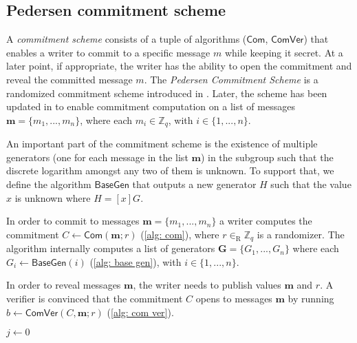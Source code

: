 \subsection{Pedersen commitment scheme}
A \textit{commitment scheme} consists of a tuple of algorithms ($\mathsf{Com}$, $\mathsf{ComVer}$) that enables a writer to commit to a specific message $m$ while keeping it secret. At a later point, if appropriate, the writer has the ability to open the commitment and reveal the committed message $m$. The \textit{Pedersen Commitment Scheme} is a randomized commitment scheme introduced in \cite{Pedersen91-commitment}. Later, the scheme has been updated in \cite{Bootle18} to enable commitment computation on a list of messages $\boldsymbol{m} = \{ m_1, ..., m_n \}$, where each $m_i \in \mathbb{Z}_q$, with $i \in \{ 1, ..., n \}$.

An important part of the commitment scheme is the existence of multiple generators (one for each message in the list  $\boldsymbol{m}$) in the subgroup such that the discrete logarithm amongst any two of them is unknown. To support that, we define the algorithm $\mathsf{BaseGen}$ that outputs a new generator $H$ such that the value $x$ is unknown where $H = [x]G$.

In order to commit to messages $\boldsymbol{m} = \{ m_1, ..., m_n \}$ a writer computes the commitment $C \gets \mathsf{Com}(\boldsymbol{m}; r)$ (\cref{alg: com}), where $r \in_\mathrm{R} \mathbb{Z}_q$ is a randomizer. The algorithm internally computes a list of generators $\boldsymbol{G} = \{ G_1, ..., G_n \}$ where each $G_i \gets \mathsf{BaseGen}(i)$ (\cref{alg: base gen}), with $i \in \{ 1, ..., n \}$.

In order to reveal messages $\boldsymbol{m}$, the writer needs to publish values $\boldsymbol{m}$ and $r$. A verifier is convinced that the commitment $C$ opens to messages $\boldsymbol{m}$ by running $b \gets \mathsf{ComVer}(C, \boldsymbol{m}; r)$ (\cref{alg: com ver}).

\begin{algorithm}[ht]
    \DontPrintSemicolon
    \caption{$\mathsf{BaseGen} (i)$}
    \label{alg: base gen}
    
    $j \gets 0$ \\
     
\end{algorithm}

